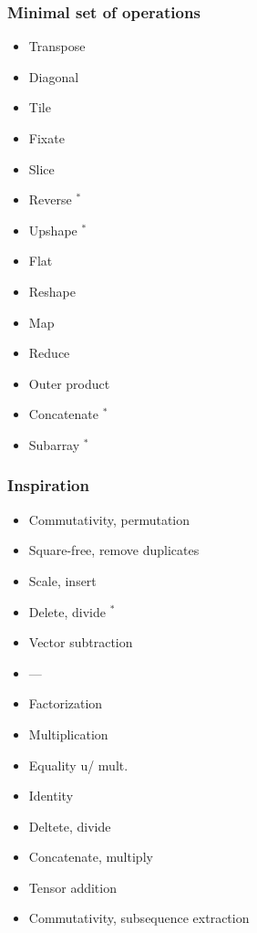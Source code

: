 \documentclass[xetex,mathserif,serif]{beamer}
\begin{document}
\begin{frame}
  \frametitle{Minimal set of operations}
  
  \begin{multicols}{3}
    \begin{itemize}
      \item Transpose
      \item Diagonal
      \item Tile
      \item Fixate
      \item Slice
      \item Reverse $^*$
      \columnbreak
      
      \item Upshape $^*$
      \item Flat
      \item Reshape
      \vfill
      \item Map
      \columnbreak

      \item Reduce
      \item Outer product
      \item Concatenate $^*$
      \item Subarray $^*$
      \vfill
    \end{itemize}
  \end{multicols}
\end{frame}

\begin{frame}
  \frametitle{Inspiration}
  
  \begin{multicols}{3}
    \footnotesize
    \begin{itemize}
      \item Commutativity, permutation
      \item Square-free, remove duplicates
      \item Scale, insert
      \item Delete, divide $^*$
      \item Vector subtraction
      \item ---
      \columnbreak
      
      \item Factorization
      \item Multiplication
      \item Equality u/ mult.
      \vfill
      \item Identity
      \columnbreak

      \item Deltete, divide
      \item Concatenate, multiply
      \item Tensor addition
      \item Commutativity, subsequence extraction
      \vfill
    \end{itemize}
  \end{multicols}
\end{frame}
\end{document}
